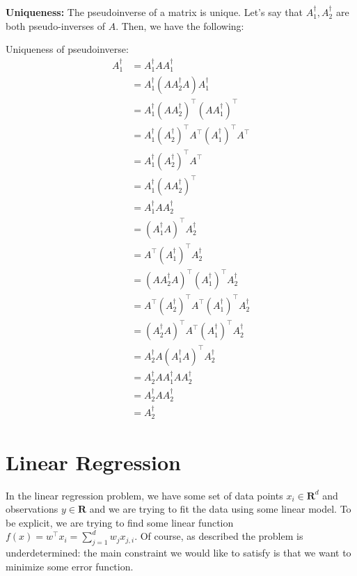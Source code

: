 \documentclass[answers,12pt]{exam}
\begin{document}
\textbf{Uniqueness:} 
The pseudoinverse of a matrix is unique.
Let's say that $A_1^{\dagger}, A_2^{\dagger}$ are both pseudo-inverses of $A$.
Then, we have the following:
\begin{solution}
    Uniqueness of pseudoinverse:
    \begin{align*}
        A_1^{\dagger} &= A_1^{\dagger} A A_1^{\dagger} \\
        &= A_1^{\dagger} (A A_2^{\dagger} A) A_1^{\dagger} \\
        &= A_1^{\dagger} {(A A_2^{\dagger})}^{\top} {(A A_1^{\dagger})}^{\top} \\
        &= A_1^{\dagger} {(A_2^{\dagger})}^{\top} A^{\top} {(A_1^{\dagger})}^{\top} A^{\top} \\
        &= A_1^{\dagger} {(A_2^{\dagger})}^{\top} A^{\top} \\
        &= A_1^{\dagger} {(A A_2^{\dagger})}^{\top} \\
        &= A_1^{\dagger} A A_2^{\dagger} \\
        &= {(A_1^{\dagger} A)}^{\top} A_2^{\dagger} \\
        &= A^{\top} {(A_1^{\dagger})}^{\top} A_2^{\dagger} \\
        &= {(A A_2^{\dagger} A)}^{\top} {(A_1^{\dagger})}^{\top} A_2^{\dagger} \\
        &= A^{\top} {(A_2^{\dagger})}^{\top} A^{\top} {(A_1^{\dagger})}^{\top} A_2^{\dagger} \\
        &= {(A_2^{\dagger} A)}^{\top} A^{\top} {(A_1^{\dagger})}^{\top} A_2^{\dagger} \\
        &= A_2^{\dagger} A {(A_1^{\dagger} A)}^{\top} A_2^{\dagger} \\
        &= A_2^{\dagger} A A_1^{\dagger} A A_2^{\dagger} \\
        &= A_2^{\dagger} A A_2^{\dagger} \\
        &= A_2^{\dagger}
    \end{align*}
\end{solution}

\section{Linear Regression}
In the linear regression problem, we have some set of data points $x_i \in \mathbf{R}^d$ and observations $y \in \mathbf{R}$ and we are trying to fit the data using some linear model.
To be explicit, we are trying to find some linear function $f(x) = w^{\top} x_i = \sum_{j=1}^d w_j x_{j,i}$.
Of course, as described the problem is underdetermined:
the main constraint we would like to satisfy is that we want to minimize some error function.
\end{document}
